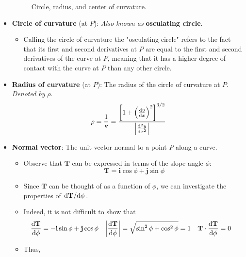 \documentclass[../main.tex]{subfiles}
\begin{document}
\begin{itemize}
\begin{figure}[h!]
        \caption{Circle, radius, and center of curvature.}
        \label{fig:circleCurvature}
    \end{figure}
    \item \textbf{Circle of curvature} (at $P$):  \emph{Also known as} \textbf{osculating circle}.
    \begin{itemize}
        \item Calling the circle of curvature the "osculating circle" refers to the fact that its first and second derivatives at $P$ are equal to the first and second derivatives of the curve at $P$, meaning that it has a higher degree of contact with the curve at $P$ than any other circle.
    \end{itemize}
    \item \textbf{Radius of curvature} (at $P$): The radius of the circle of curvature at $P$. \emph{Denoted by} $\rho$.
    \begin{equation*}
        \rho = \frac{1}{\kappa}
        = \frac{\left[ 1+\left( \dv{y}{x} \right)^2 \right]^{3/2}}{\left| \dv[2]{y}{x} \right|}
    \end{equation*}
    \item \textbf{Normal vector}: The unit vector normal to a point $P$ along a curve.
    \begin{itemize}
        \item Observe that $\textbf{T}$ can be expressed in terms of the slope angle $\phi$:
        \begin{equation*}
            \textbf{T} = \textbf{i}\cos\phi+\textbf{j}\sin\phi
        \end{equation*}
        \item Since $\textbf{T}$ can be thought of as a function of $\phi$, we can investigate the properties of $\dv*{\textbf{T}}{\phi}$.
        \item Indeed, it is not difficult to show that
        \begin{align*}
            \dv{\textbf{T}}{\phi} &= -\textbf{i}\sin\phi+\textbf{j}\cos\phi&
                \left| \dv{\textbf{T}}{\phi} \right| &= \sqrt{\sin^2\phi+\cos^2\phi} = 1&
                    \textbf{T}\cdot\dv{\textbf{T}}{\phi} &= 0
        \end{align*}
        \item Thus,

\end{itemize}
\end{itemize}
\end{document}
